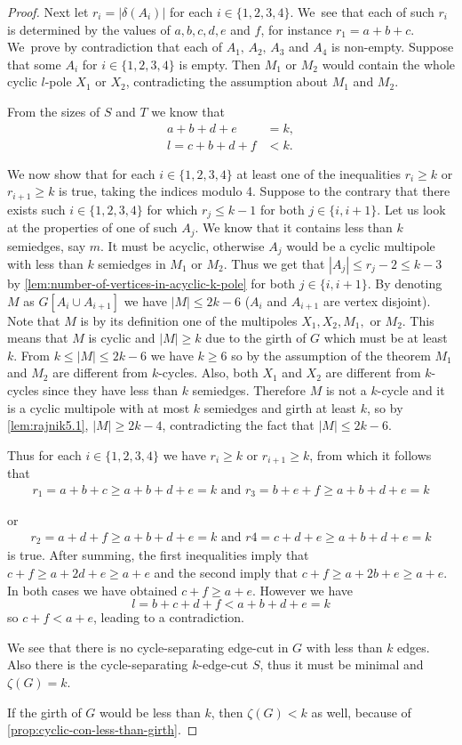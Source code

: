 \documentclass[12pt, twoside]{book}
\begin{document}
\begin{proof}
	Next let $r_i=|\delta(A_i)|$ for each $i\in\{1,2,3,4\}$. We~see that each of such $r_i$ is determined by the values of $a,b,c,d,e$ and $f$, for instance $r_1=a+b+c$. We~prove by contradiction that each of $A_1, \,A_2,\,A_3$ and $A_4$ is non-empty. Suppose that some $A_i$ for $i\in\{1,2,3,4\}$ is empty. Then $M_1$ or $M_2$ would contain the whole cyclic $l$-pole $X_1$ or $X_2$, contradicting the assumption about $M_1$ and $M_2$.
	
	From the sizes of $S$ and $T$ we know that
	\begin{align*}
		a+b+d+e &= k,\\
		l=c+b+d+f &< k.
	\end{align*}
	
	We now show that for each $i\in\{1,2,3,4\}$ at least one of the inequalities $r_i\geq k$ or $r_{i+1}\geq k$ is true, taking the indices modulo 4. Suppose to the contrary that there exists such $i\in\{1,2,3,4\}$ for which $r_j\leq k-1$ for both $j\in\{i, i+1\}$. Let us look at the properties of one of such $A_j$. We know that it contains less than $k$ semiedges, say $m$. It must be acyclic, otherwise $A_j$ would be a cyclic multipole with less than $k$ semiedges in $M_1$ or $M_2$. Thus we get that $|A_j|\leq r_j-2\leq k-3$ by \cref{lem:number-of-vertices-in-acyclic-k-pole} for both $j\in \{i, i+1\}$. By denoting $M$ as $G[A_i\cup A_{i+1}]$ we have $|M|\leq 2k-6$ ($A_i$ and $A_{i+1}$ are vertex disjoint). Note that $M$ is by its definition one of the multipoles $X_1, X_2, M_1,$ or $M_2$. This means that $M$ is cyclic and $|M|\geq k$ due to the girth of $G$ which must be at least $k$. From $k\leq |M|\leq 2k-6$ we have $k\geq 6$ so by the assumption of the theorem $M_1$ and $M_2$ are different from $k$-cycles. Also, both $X_1$ and $X_2$ are different from $k$-cycles since they have less than $k$ semiedges. Therefore $M$ is not a $k$-cycle and it is a cyclic multipole with at most $k$ semiedges and girth at least $k$, so by \cref{lem:rajnik5.1}, $|M| \geq 2k - 4$, contradicting the fact that $|M|\leq 2k-6$.
	
	Thus for each $i\in\{1,2,3,4\}$ we have $r_i\geq k$ or $r_{i+1}\geq k$, from which it follows that
	\begin{align*}
	r_1 =a+b+c\geq a+b+d+e=k \text{ and } r_3 =b+e+f \geq a+b+d+e=k
	\end{align*}
	
	or
	\begin{align*}
		r_2 =a+d+f \geq a+b+d+e=k \text{ and } r4 =c+d+e\geq a+b+d+e=k
	\end{align*}
	is true. After summing, the first inequalities imply that $c+f\geq a+2d+e\geq a+e$ and the second imply that $c+f\geq a+2b+e\geq a+e$. In both cases we have obtained $c+f\geq a+e$. However we have 
	$$l=b+c+d+f<a+b+d+e=k$$
	so $c+f<a+e$, leading to a contradiction.
	
	We see that there is no cycle-separating edge-cut in $G$ with less than $k$ edges. Also there is the \mbox{cycle-separating} $k$-edge-cut $S$, thus it must be minimal and $\zeta(G)=k$.
	
	If the girth of $G$ would be less than $k$, then ${\zeta(G)<k}$ as well, because of \cref{prop:cyclic-con-less-than-girth}.
\end{proof}
\end{document}
